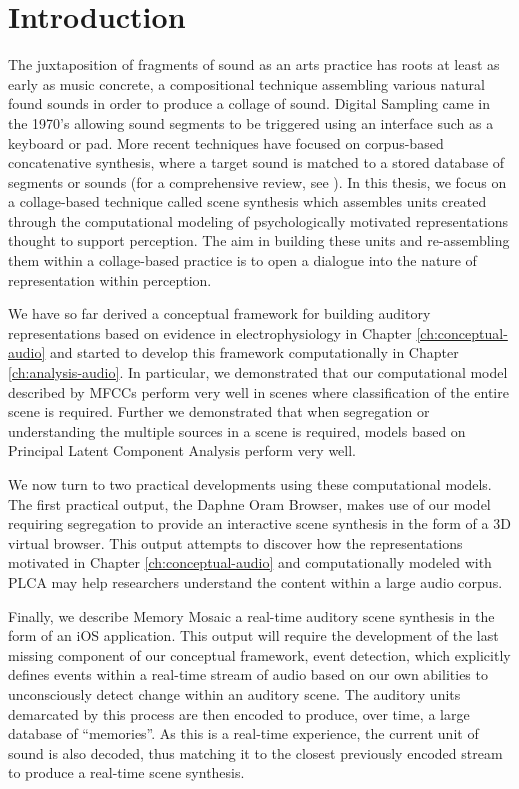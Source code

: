 \documentclass[a4paper,10pt,final]{ThesisStyle}
\begin{document}
\section{Introduction}

The juxtaposition of fragments of sound as an arts practice has roots at least as early as music concrete, a compositional technique assembling various natural found sounds in order to produce a collage of sound.  Digital Sampling came in the 1970's allowing sound segments to be triggered using an interface such as a keyboard or pad.  More recent techniques have focused on corpus-based concatenative synthesis, where a target sound is matched to a stored database of segments or sounds (for a comprehensive review, see \cite{Schwarz2006}).  In this thesis, we focus on a collage-based technique called scene synthesis which assembles units created through the computational modeling of psychologically motivated representations thought to support perception.  The aim in building these units and re-assembling them within a collage-based practice is to open a dialogue into the nature of representation within perception.  

We have so far derived a conceptual framework for building auditory representations based on evidence in electrophysiology in Chapter \ref{ch:conceptual-audio} and started to develop this framework computationally in Chapter \ref{ch:analysis-audio}.  In particular, we demonstrated that our computational model described by MFCCs perform very well in scenes where classification of the entire scene is required.  Further we demonstrated that when segregation or understanding the multiple sources in a scene is required, models based on Principal Latent Component Analysis perform very well.  

We now turn to two practical developments using these computational models.  The first practical output, the Daphne Oram Browser, makes use of our model requiring segregation to provide an interactive scene synthesis in the form of a 3D virtual browser.  This output attempts to discover how the representations motivated in Chapter \ref{ch:conceptual-audio} and computationally modeled with PLCA may help researchers understand the content within a large audio corpus.  

Finally, we describe Memory Mosaic a real-time auditory scene synthesis in the form of an iOS application.  This output will require the development of the last missing component of our conceptual framework, event detection, which explicitly defines events within a real-time stream of audio based on our own abilities to unconsciously detect change within an auditory scene.  The auditory units demarcated by this process are then encoded to produce, over time, a large database of ``memories''.  As this is a real-time experience, the current unit of sound is also decoded, thus matching it to the closest previously encoded stream to produce a real-time scene synthesis. 
\end{document}
